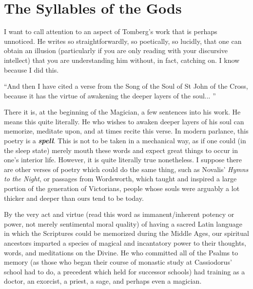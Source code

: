 \section{The Syllables of the Gods}

I want to call attention to an aspect of Tomberg's work that is perhaps unnoticed. He writes so straightforwardly, so poetically, so lucidly, that one can obtain an illusion (particularly if you are only reading with your discursive intellect) that you are understanding him without, in fact, catching on. I know because I did this.

\begin{quotex}
``And then I have cited a verse from the Song of the Soul of St John of the Cross, because it has the virtue of awakening the deeper layers of the soul... ''
\end{quotex}


There it is, at the beginning of the Magician, a few sentences into his work. He means this quite literally. He who wishes to awaken deeper layers of his soul can memorize, meditate upon, and at times recite this verse. In modern parlance, this poetry is a \textbf{\emph{spell}}. This is not to be taken in a mechanical way, as if one could (in the sleep state) merely mouth these words and expect great things to occur in one's interior life. However, it is quite literally true nonetheless. I suppose there are other verses of poetry which could do the same thing, such as Novalis' \emph{Hymns to the Night}, or passages from Wordsworth, which taught and inspired a large portion of the generation of Victorians, people whose souls were arguably a lot thicker and deeper than ours tend to be today.

By the very act and virtue (read this word as immanent/inherent potency or power, not merely sentimental moral quality) of having a sacred Latin language in which the Scriptures could be memorized during the Middle Ages, our spiritual ancestors imparted a species of magical and incantatory power to their thoughts, words, and meditations on the Divine. He who committed all of the Psalms to memory (as those who began their course of monastic study at Cassiodorus' school had to do, a precedent which held for successor schools) had training as a doctor, an exorcist, a priest, a sage, and perhaps even a magician.

